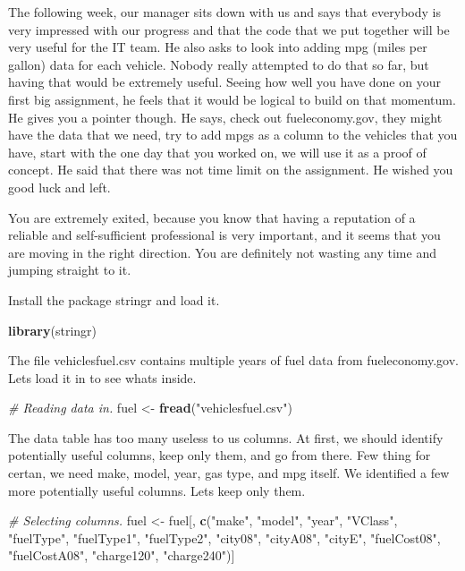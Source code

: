 \documentclass[]{book}
\newenvironment{Shaded}{\begin{snugshade}}{\end{snugshade}}
\newcommand{\CommentTok}[1]{\textcolor[rgb]{0.56,0.35,0.01}{\textit{#1}}}
\newcommand{\KeywordTok}[1]{\textcolor[rgb]{0.13,0.29,0.53}{\textbf{#1}}}
\newcommand{\NormalTok}[1]{#1}
\newcommand{\StringTok}[1]{\textcolor[rgb]{0.31,0.60,0.02}{#1}}
\begin{document}
The following week, our manager sits down with us and says that everybody is very impressed with our progress and that the code that we put together will be very useful for the IT team. He also asks to look into adding mpg (miles per gallon) data for each vehicle. Nobody really attempted to do that so far, but having that would be extremely useful. Seeing how well you have done on your first big assignment, he feels that it would be logical to build on that momentum. He gives you a pointer though. He says, check out fueleconomy.gov, they might have the data that we need, try to add mpgs as a column to the vehicles that you have, start with the one day that you worked on, we will use it as a proof of concept. He said that there was not time limit on the assignment. He wished you good luck and left.

You are extremely exited, because you know that having a reputation of a reliable and self-sufficient professional is very important, and it seems that you are moving in the right direction. You are definitely not wasting any time and jumping straight to it.

Install the package stringr and load it.

\begin{Shaded}
\begin{Highlighting}[]
\KeywordTok{library}\NormalTok{(stringr)}
\end{Highlighting}
\end{Shaded}

The file vehiclesfuel.csv contains multiple years of fuel data from fueleconomy.gov. Lets load it in to see whats inside.

\begin{Shaded}
\begin{Highlighting}[]
\CommentTok{# Reading data in.}
\NormalTok{fuel <-}\StringTok{ }\KeywordTok{fread}\NormalTok{(}\StringTok{"vehiclesfuel.csv"}\NormalTok{)}
\end{Highlighting}
\end{Shaded}

The data table has too many useless to us columns. At first, we should identify potentially useful columns, keep only them, and go from there. Few thing for certan, we need make, model, year, gas type, and mpg itself. We identified a few more potentially useful columns. Lets keep only them.

\begin{Shaded}
\begin{Highlighting}[]
\CommentTok{# Selecting columns.}
\NormalTok{fuel <-}\StringTok{ }\NormalTok{fuel[, }\KeywordTok{c}\NormalTok{(}\StringTok{"make"}\NormalTok{, }\StringTok{"model"}\NormalTok{, }\StringTok{"year"}\NormalTok{, }\StringTok{"VClass"}\NormalTok{, }\StringTok{"fuelType"}\NormalTok{, }
                    \StringTok{"fuelType1"}\NormalTok{, }\StringTok{"fuelType2"}\NormalTok{, }\StringTok{"city08"}\NormalTok{, }\StringTok{"cityA08"}\NormalTok{, }
                    \StringTok{"cityE"}\NormalTok{, }\StringTok{"fuelCost08"}\NormalTok{, }\StringTok{"fuelCostA08"}\NormalTok{, }\StringTok{"charge120"}\NormalTok{, }
                    \StringTok{"charge240"}\NormalTok{)]}
\end{Highlighting}
\end{Shaded}
\end{document}
